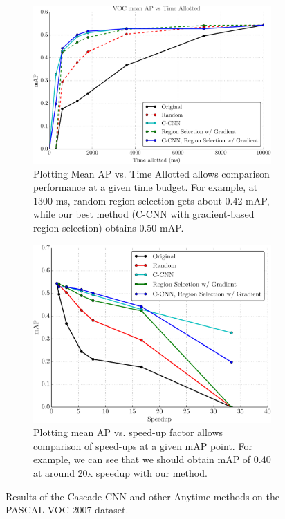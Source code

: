 \begin{figure}[ht]
\begin{subfigure}[b]{\linewidth}
    \centering
    \includegraphics[width=.75\linewidth]{../ccnn/figures/_apvst_final.pdf}
    \caption{
Plotting Mean AP vs. Time Allotted allows comparison performance at a given time budget.
For example, at 1300 ms, random region selection gets about 0.42 mAP, while our best method (C-CNN with gradient-based region selection) obtains 0.50 mAP.
}\label{fig:apvst}
\end{subfigure}
\begin{subfigure}[b]{\linewidth}
    \centering
    \includegraphics[width=.75\linewidth]{../ccnn/figures/_speedup_final_abs.pdf}
    \caption{
Plotting mean AP vs. speed-up factor allows comparison of speed-ups at a given mAP point.
For example, we can see that we should obtain mAP of 0.40 at around 20x speedup with our method.
}\label{fig:speedup}
\end{subfigure}
\caption{
Results of the Cascade CNN and other Anytime methods on the PASCAL VOC 2007 dataset.
}\label{fig:voc2007_results}
\end{figure}
